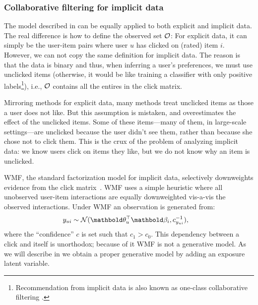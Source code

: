 \subsubsection{Collaborative filtering for implicit data} 
\label{chpt:background:sec:cf_implicit}

The model described in  can be equally applied to both explicit and implicit data. The real difference is how to define the observed set $\mathcal{O}$: For explicit data, it can simply be the user-item pairs where user $u$ has clicked on (rated) item $i$. However, we can not copy the same definition for implicit data. The reason is that the data is binary and thus, when inferring a user's preferences, we must use unclicked items (otherwise, it would be like training a classifier with only positive labels\footnote{Recommendation from implicit data is also known as one-class collaborative filtering \citep{pan2008one}.}), i.e., $\mathcal{O}$ contains all the entires in the click matrix. 

Mirroring methods for explicit data, many methods treat unclicked items as those a user does not like.  But this assumption is mistaken, and overestimates the effect of the unclicked items.  Some of these
items---many of them, in large-scale settings---are unclicked because
the user didn't see them, rather than because she chose not to
click them.  This is the crux of the problem of analyzing implicit
data: we know users click on items they like, but we do not know why
an item is unclicked.

\gls{WMF}, the standard factorization model for implicit
data, selectively downweights evidence from the click
matrix~\citep{hu2008collaborative}.  \gls{WMF} uses a simple heuristic where all
unobserved user-item interactions are equally downweighted vis-a-vis the
observed interactions. Under \gls{WMF} an observation is generated from:
\begin{align*} 
y_{ui} &\sim \mathcal{N}(\mb\theta_u^\top\mb\beta_i, c^{-1}_{y_{ui}}),
\end{align*}
where the ``confidence'' $c$ is set such that $c_1 > c_0$. This dependency between a
click and itself is unorthodox; because of it \gls{WMF} is not a generative
model. As we will describe in  we obtain a proper generative
model by adding an exposure latent variable. 

